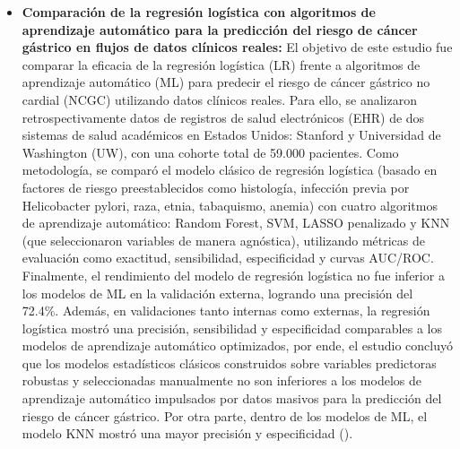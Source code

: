 \begin{itemize}
    \item \textbf{Comparación de la regresión logística con algoritmos de aprendizaje automático para la predicción del riesgo de cáncer gástrico en flujos de datos clínicos reales:} El objetivo de este estudio fue comparar la eficacia de la regresión logística (LR) frente a algoritmos de aprendizaje automático (ML) para predecir el riesgo de cáncer gástrico no cardial (NCGC) utilizando datos clínicos reales. Para ello, se analizaron retrospectivamente datos de registros de salud electrónicos (EHR) de dos sistemas de salud académicos en Estados Unidos: Stanford y Universidad de Washington (UW), con una cohorte total de 59.000 pacientes. Como metodología, se comparó el modelo clásico de regresión logística (basado en factores de riesgo preestablecidos como histología, infección previa por Helicobacter pylori, raza, etnia, tabaquismo, anemia) con cuatro algoritmos de aprendizaje automático: Random Forest, SVM, LASSO penalizado y KNN (que seleccionaron variables de manera agnóstica), utilizando métricas de evaluación como exactitud, sensibilidad, especificidad y curvas AUC/ROC. Finalmente, el rendimiento del modelo de regresión logística no fue inferior a los modelos de ML en la validación externa, logrando una precisión del 72.4\%. Además, en validaciones tanto internas como externas, la regresión logística mostró una precisión, sensibilidad y especificidad comparables a los modelos de aprendizaje automático optimizados, por ende, el estudio concluyó que los modelos estadísticos clásicos construidos sobre variables predictoras robustas y seleccionadas manualmente no son inferiores a los modelos de aprendizaje automático impulsados por datos masivos para la predicción del riesgo de cáncer gástrico. Por otra parte, dentro de los modelos de ML, el modelo KNN mostró una mayor precisión y especificidad (\cite{article5}).

\end{itemize}
